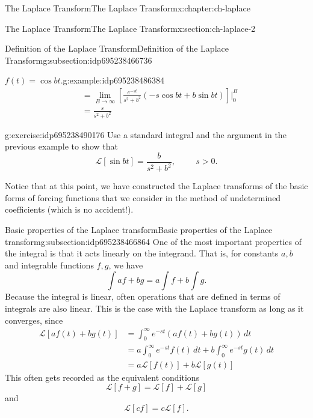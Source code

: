 \documentclass[oneside,10pt,]{book}
\numberwithin{equation}{section}
\numberwithin{equation}{section}
\newcommand{\amp}{&}
\begin{document}
\begin{chapterptx}{The Laplace Transform}{}{The Laplace Transform}{}{}{x:chapter:ch-laplace}
\begin{sectionptx}{The Laplace Transform}{}{The Laplace Transform}{}{}{x:section:ch-laplace-2}
\begin{subsectionptx}{Definition of the Laplace Transform}{}{Definition of the Laplace Transform}{}{}{g:subsection:idp695238466736}
\begin{example}{\(f(t) = \cos bt\).}{g:example:idp695238486384}
\begin{align*}
\amp= \lim_{B \to \infty} \left[ \frac{e^{-st}}{s^2 + b^2} (-s\cos bt + b \sin bt)\right]\bigg\rvert_0^B\\
\amp= \frac{s}{s^2 + b^2}
\end{align*}
%
\end{example}
\begin{inlineexercise}{}{g:exercise:idp695238490176}%
Use a standard integral and the argument in the previous example to show that%
\begin{equation*}
\mathcal{L}[\sin bt] = \frac{b}{s^2 + b^2}, \hspace{1cm} s > 0.
\end{equation*}
%
\end{inlineexercise}%
 Notice that at this point, we have constructed the Laplace transforms of the basic forms of forcing functions that we consider in the method of undetermined coefficients (which is no accident!).\end{subsectionptx}
%
%
\typeout{************************************************}
\typeout{************************************************}
%
\begin{subsectionptx}{Basic properties of the Laplace transform}{}{Basic properties of the Laplace transform}{}{}{g:subsection:idp695238466864}
One of the most important properties of the integral is that it acts linearly on the integrand. That is, for constants \(a,b\) and integrable functions \(f,g\), we have%
\begin{equation*}
\int af + bg = a\int f + b \int g.
\end{equation*}
Because the integral is linear, often operations that are defined in terms of integrals are also linear. This is the case with the Laplace transform as long as it converges, since%
\begin{align*}
\mathcal{L}[af(t) + bg(t)] \amp= \int_0^\infty e^{-st}(a f(t) + b g(t)) \, dt\\
\amp= a \int_0^\infty e^{-st}f(t) \, dt + b \int_0^\infty e^{-st} g(t) \, dt\\
\amp = a \mathcal{L}[f(t)] + b \mathcal{L}[g(t)]
\end{align*}
This often gets recorded as the equivalent conditions%
\begin{equation}
\mathcal{L}[f+g] = \mathcal{L}[f] + \mathcal{L}[g]\label{g:men:idp695238495392}
\end{equation}
and%
\begin{equation}
\mathcal{L}[cf] = c \mathcal{L}[f].\label{g:men:idp695238495776}

\end{equation}
\end{subsectionptx}
\end{sectionptx}
\end{chapterptx}
\end{document}
